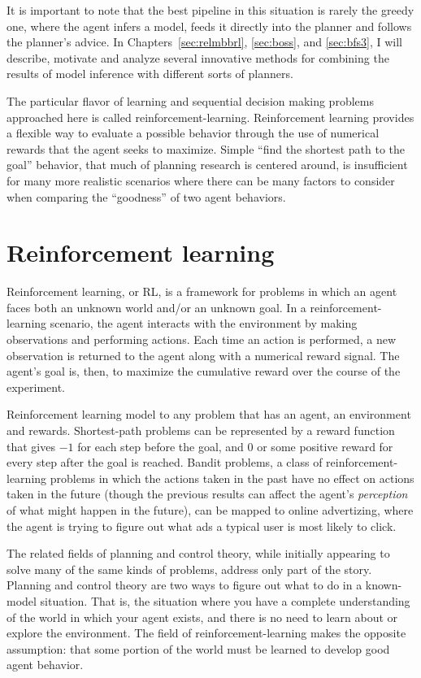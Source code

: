 It is important to note that the best pipeline in this situation is rarely the greedy one, where the agent infers a model, feeds it directly into the planner and follows the planner's advice. In Chapters~\ref{sec:relmbbrl}, \ref{sec:boss}, and \ref{sec:bfs3}, I will describe, motivate and analyze several innovative methods for combining the results of model inference with different sorts of planners.

The particular flavor of learning and sequential decision making problems approached here is called reinforcement-learning. Reinforcement learning provides a flexible way to evaluate a possible behavior through the use of numerical rewards that the agent seeks to maximize. Simple ``find the shortest path to the goal'' behavior, that much of planning research is centered around, is insufficient for many more realistic scenarios where there can be many factors to consider when comparing the ``goodness'' of two agent behaviors.

\section{Reinforcement learning}

Reinforcement learning, or RL, is a framework for problems in which an agent faces both an unknown world and/or an unknown goal. In a reinforcement-learning scenario, the agent interacts with the environment by making observations and performing actions. Each time an action is performed, a new observation is returned to the agent along with a numerical reward signal. The agent's goal is, then, to maximize the cumulative reward over the course of the experiment.

Reinforcement learning model to any problem that has an agent, an environment and rewards. Shortest-path problems can be represented by a reward function that gives $-1$ for each step before the goal, and $0$ or some positive reward for every step after the goal is reached. Bandit problems, a class of reinforcement-learning problems in which the actions taken in the past have no effect on actions taken in the future (though the previous results can affect the agent's \emph{perception} of what might happen in the future), can be mapped to online advertizing, where the agent is trying to figure out what ads a typical user is most likely to click.

The related fields of planning and control theory, while initially appearing to solve many of the same kinds of problems, address only part of the story. Planning and control theory are two ways to figure out what to do in a known-model situation. That is, the situation where you have a complete understanding of the world in which your agent exists, and there is no need to learn about or explore the environment. The field of reinforcement-learning makes the opposite assumption: that some portion of the world must be learned to develop good agent behavior.

